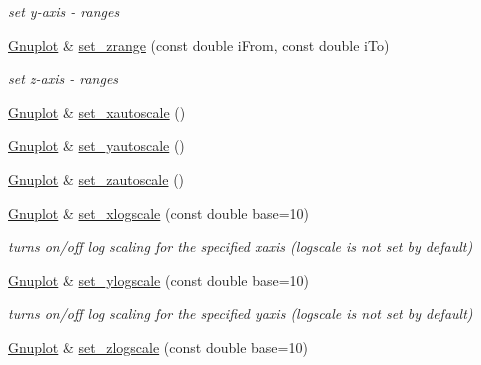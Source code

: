\begin{DoxyCompactItemize}
\begin{DoxyCompactList}\small\item\em set y-\/axis -\/ ranges \end{DoxyCompactList}\item 
\hyperlink{classkukadu_1_1Gnuplot}{Gnuplot} \& \hyperlink{classkukadu_1_1Gnuplot_a719ea05d40c1cdd23f6844a494064720}{set\+\_\+zrange} (const double i\+From, const double i\+To)\hypertarget{classkukadu_1_1Gnuplot_a719ea05d40c1cdd23f6844a494064720}{}\label{classkukadu_1_1Gnuplot_a719ea05d40c1cdd23f6844a494064720}

\begin{DoxyCompactList}\small\item\em set z-\/axis -\/ ranges \end{DoxyCompactList}\item 
\hyperlink{classkukadu_1_1Gnuplot}{Gnuplot} \& \hyperlink{classkukadu_1_1Gnuplot_ad895bac1da923236a2bbbddf13df4f5b}{set\+\_\+xautoscale} ()
\item 
\hyperlink{classkukadu_1_1Gnuplot}{Gnuplot} \& \hyperlink{classkukadu_1_1Gnuplot_aa5c079210584a06fa50ae99f5fe2d00d}{set\+\_\+yautoscale} ()
\item 
\hyperlink{classkukadu_1_1Gnuplot}{Gnuplot} \& \hyperlink{classkukadu_1_1Gnuplot_a24266265b9d32e8991d1ac053dbc58c5}{set\+\_\+zautoscale} ()
\item 
\hyperlink{classkukadu_1_1Gnuplot}{Gnuplot} \& \hyperlink{classkukadu_1_1Gnuplot_a11893bdae68ab25f8ecb95818ca65395}{set\+\_\+xlogscale} (const double base=10)\hypertarget{classkukadu_1_1Gnuplot_a11893bdae68ab25f8ecb95818ca65395}{}\label{classkukadu_1_1Gnuplot_a11893bdae68ab25f8ecb95818ca65395}

\begin{DoxyCompactList}\small\item\em turns on/off log scaling for the specified xaxis (logscale is not set by default) \end{DoxyCompactList}\item 
\hyperlink{classkukadu_1_1Gnuplot}{Gnuplot} \& \hyperlink{classkukadu_1_1Gnuplot_a83bdceeb4e068075caf98b030ef9372f}{set\+\_\+ylogscale} (const double base=10)\hypertarget{classkukadu_1_1Gnuplot_a83bdceeb4e068075caf98b030ef9372f}{}\label{classkukadu_1_1Gnuplot_a83bdceeb4e068075caf98b030ef9372f}

\begin{DoxyCompactList}\small\item\em turns on/off log scaling for the specified yaxis (logscale is not set by default) \end{DoxyCompactList}\item 
\hyperlink{classkukadu_1_1Gnuplot}{Gnuplot} \& \hyperlink{classkukadu_1_1Gnuplot_aaeecd89ae7aabf9fb304f60965198588}{set\+\_\+zlogscale} (const double base=10)\hypertarget{classkukadu_1_1Gnuplot_aaeecd89ae7aabf9fb304f60965198588}{}\label{classkukadu_1_1Gnuplot_aaeecd89ae7aabf9fb304f60965198588}


\end{DoxyCompactItemize}
